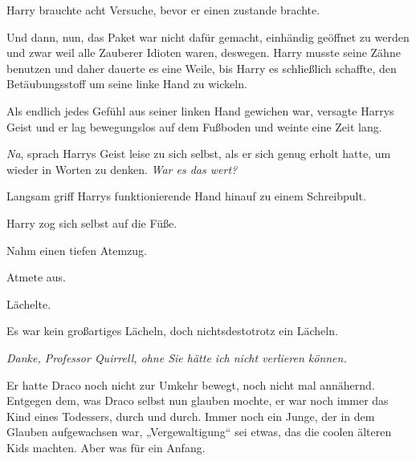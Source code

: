 Harry brauchte acht Versuche, bevor er einen  zustande brachte.

Und dann, nun, das Paket war nicht dafür gemacht, einhändig geöffnet zu werden und zwar weil alle Zauberer Idioten waren, deswegen. Harry musste seine Zähne benutzen und daher dauerte es eine Weile, bis Harry es schließlich schaffte, den Betäubungsstoff um seine linke Hand zu wickeln.

Als endlich jedes Gefühl aus seiner linken Hand gewichen war, versagte Harrys Geist und er lag bewegungslos auf dem Fußboden und weinte eine Zeit lang.

\emph{Na}, sprach Harrys Geist leise zu sich selbst, als er sich genug erholt hatte, um wieder in Worten zu denken. \emph{War es das wert?}

Langsam griff Harrys funktionierende Hand hinauf zu einem Schreibpult.

Harry zog sich selbst auf die Füße.

Nahm einen tiefen Atemzug.

Atmete aus.

Lächelte.

Es war kein großartiges Lächeln, doch nichtsdestotrotz ein Lächeln.

\emph{Danke, Professor Quirrell, ohne Sie hätte ich nicht verlieren können.}

Er hatte Draco noch nicht zur Umkehr bewegt, noch nicht mal annähernd. Entgegen dem, was Draco selbst nun glauben mochte, er war noch immer das Kind eines Todessers, durch und durch. Immer noch ein Junge, der in dem Glauben aufgewachsen war, „Vergewaltigung“ sei etwas, das die coolen älteren Kids machten. Aber was für ein Anfang.

